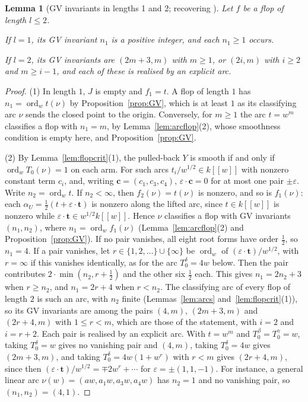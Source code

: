 \documentclass[11pt]{amsart}
\numberwithin{table}{section}
\numberwithin{figure}{section}
\numberwithin{equation}{section}
\newtheorem{lem}[thm]{Lemma}
\theoremstyle{definition}
\theoremstyle{plain}
\DeclareMathOperator{\ord}{ord}
\begin{document}
\begin{lem}[{GV invariants in lengths 1 and 2; recovering \cite[Cor~8.13]{BW}}]\label{lem:length2}
Let $f$ be a flop of length $l \le 2$.
\begin{thmlist}
\item If $l = 1$, its GV invariant $n_1$ is a positive integer, and each $n_1 \ge 1$ occurs.
\item If $l = 2$, its GV invariants are $(2m + 3, m)$ with $m \ge 1$, or $(2i, m)$ with $i \ge 2$ and $m \ge i - 1$, and each of these is realised by an explicit arc.
\end{thmlist}
\end{lem}

\begin{proof}
(1) In length $1$, $J$ is empty and $f_1 = t$. A flop of length $1$ has $n_1 = \ord_w t(\nu)$ by Proposition~\ref{prop:GV}, which is at least $1$ as its classifying arc $\nu$ sends the closed point to the origin. Conversely, for $m \ge 1$ the arc $t = w^m$ classifies a flop with $n_1 = m$, by Lemma~\ref{lem:arcflop}(2), whose smoothness condition is empty here, and Proposition~\ref{prop:GV}.

(2) By Lemma~\ref{lem:flopcrit}(1), the pulled-back $Y$ is smooth if and only if $\ord_w T_0(\nu) = 1$ on each arm. For such arcs $t_i/w^{1/2} \in k[[w]]$ with nonzero constant term $c_i$, and, writing $\mathbf c = (c_1, c_3, c_4)$, $\varepsilon\cdot\mathbf c = 0$ for at most one pair $\pm\varepsilon$. Write $n_2 = \ord_w t$. If $n_2 < \infty$, then $f_2(\nu) = t(\nu)$ is nonzero, and so is $f_1(\nu)$: each $\alpha_U = \frac12(t + \varepsilon\cdot\mathbf t)$ is nonzero along the lifted arc, since $t \in k[[w]]$ is nonzero while $\varepsilon\cdot\mathbf t \in w^{1/2}k[[w]]$. Hence $\nu$ classifies a flop with GV invariants $(n_1, n_2)$, where $n_1 = \ord_w f_1(\nu)$ (Lemma~\ref{lem:arcflop}(2) and Proposition~\ref{prop:GV}). If no pair vanishes, all eight root forms have order $\frac12$, so $n_1 = 4$. If a pair vanishes, let $r \in \{1, 2, \dots\} \cup \{\infty\}$ be $\ord_w$ of $(\varepsilon\cdot\mathbf t)/w^{1/2}$, with $r = \infty$ if this vanishes identically, as for the arc $T_0^\delta = 4w$ below. Then the pair contributes $2\cdot\min(n_2, r + \frac12)$ and the other six $\frac12$ each. This gives $n_1 = 2n_2 + 3$ when $r \ge n_2$, and $n_1 = 2r + 4$ when $r < n_2$. The classifying arc of every flop of length $2$ is such an arc, with $n_2$ finite (Lemmas~\ref{lem:arcs} and~\ref{lem:flopcrit}(1)), so its GV invariants are among the pairs $(4, m)$, $(2m + 3, m)$ and $(2r + 4, m)$ with $1 \le r < m$, which are those of the statement, with $i = 2$ and $i = r + 2$. Each pair is realised by an explicit arc. With $t = w^m$ and $T_0^\beta = T_0^\gamma = w$, taking $T_0^\delta = w$ gives no vanishing pair and $(4, m)$, taking $T_0^\delta = 4w$ gives $(2m + 3, m)$, and taking $T_0^\delta = 4w(1 + w^r)$ with $r < m$ gives $(2r + 4, m)$, since then $(\varepsilon\cdot\mathbf t)/w^{1/2} = \mp 2w^r + \cdots$ for $\varepsilon = \pm(1, 1, -1)$. For instance, a general linear arc $\nu(w) = (aw, a_1w, a_3w, a_4w)$ has $n_2 = 1$ and no vanishing pair, so $(n_1, n_2) = (4, 1)$.
\end{proof}
\end{document}
